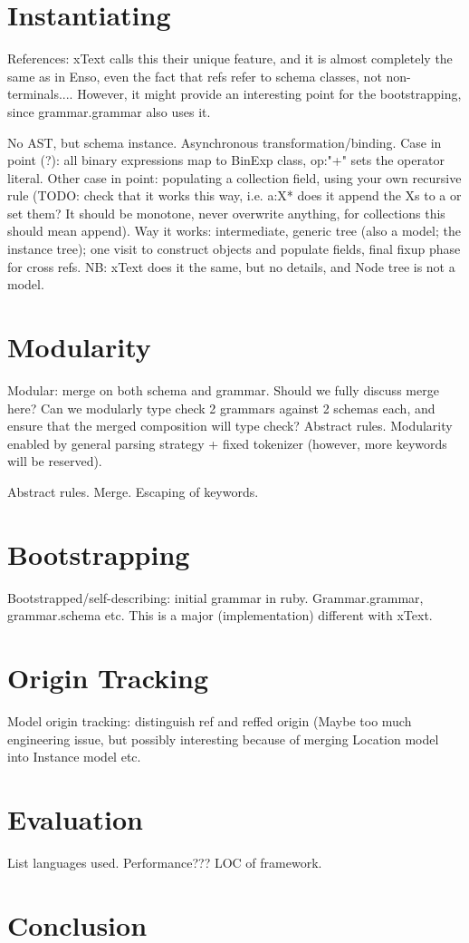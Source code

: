 \documentclass[a4paper]{article}
\begin{document}
\section{Instantiating}

References: xText calls this their unique feature, and it is almost
completely the same as in Enso, even the fact that refs refer to
schema classes, not non-terminals.... However, it might provide an
interesting point for the bootstrapping, since grammar.grammar also
uses it.

No AST, but schema instance. Asynchronous transformation/binding. Case
in point (?): all binary expressions map to BinExp class, op:"+" sets
the operator literal. Other case in point: populating a collection
field, using your own recursive rule (TODO: check that it works this
way, i.e. a:X* does it append the Xs to a or set them? It should be
monotone, never overwrite anything, for collections this should mean
append). Way it works: intermediate, generic tree (also a model; the
instance tree); one visit to construct objects and populate fields,
final fixup phase for cross refs. NB: xText does it the same, but no
details, and Node tree is not a model.

\section{Modularity}

Modular: merge on both schema and grammar. Should we fully discuss
merge here? Can we modularly type check 2 grammars against 2 schemas
each, and ensure that the merged composition will type check? Abstract
rules. Modularity enabled by general parsing strategy + fixed
tokenizer (however, more keywords will be reserved).

Abstract rules. Merge. Escaping of keywords.


\section{Bootstrapping}

Bootstrapped/self-describing: initial grammar in
ruby. Grammar.grammar, grammar.schema etc. This is a major
(implementation) different with xText.

\section{Origin Tracking}

Model origin tracking: distinguish ref and reffed origin (Maybe too
much engineering issue, but possibly interesting because of merging
Location model into Instance model etc.

\section{Evaluation}

List languages used. Performance??? LOC of framework.


\section{Conclusion}
\end{document}
